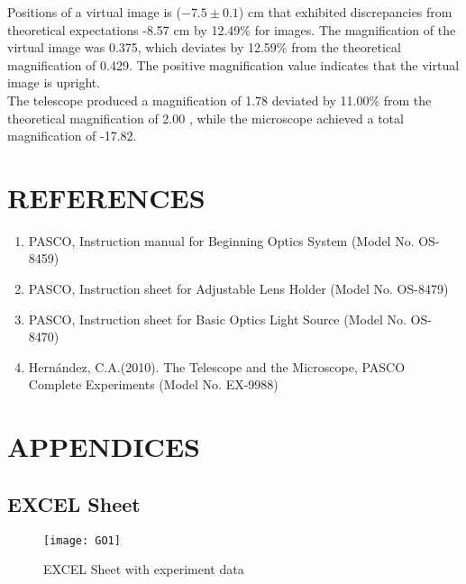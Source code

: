 \documentclass[a4paper,11pt]{article}
\begin{document}
Positions of a virtual image is (\(-7.5 \pm 0.1\)) cm that exhibited discrepancies from theoretical expectations -8.57 cm by 12.49\%  for  images. The magnification of the virtual image was 0.375, which deviates by 12.59\% from the theoretical magnification of 0.429. The positive magnification value indicates that the virtual image is upright.\\

The telescope produced a magnification of 1.78 deviated by 11.00\% from the theoretical magnification of 2.00 , while the microscope achieved a total magnification of -17.82.
\newpage
{}
\section*{\center REFERENCES}
\label{sec:REFERENCES}
\begin{enumerate}
    \item PASCO, Instruction manual for Beginning Optics System (Model No. OS-8459)
    \item PASCO, Instruction sheet for Adjustable Lens Holder (Model No. OS-8479)
    \item PASCO, Instruction sheet for Basic Optics Light Source (Model No. OS-8470)
    \item Hernández, C.A.(2010). The Telescope and the Microscope, PASCO Complete Experiments (Model No. EX-9988)
\end{enumerate}

\newpage
{}
\section*{\center APPENDICES}
\label{sec:APPENDICES}
\subsection*{EXCEL Sheet}
\begin{figure}[htbp]
\centering
\texttt{[image: GO1]}
\caption{EXCEL Sheet with experiment data}
\label{6}
\end{figure}
\newpage
\end{document}
